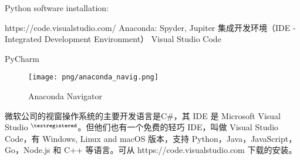 \documentclass[main.tex]{subfiles}
\begin{document}
Python software installation:

https://code.visualstudio.com/
Anaconda: Spyder, Jupiter
集成开发环境（IDE - Integrated Development Environment）
Visual Studio Code

PyCharm

\begin{figure}[h]
	\centering
	\texttt{[image: png/anaconda\_navig.png]}
	\caption{Anaconda Navigator}
	\label{fig:III.1.3}
\end{figure}


微软公司的视窗操作系统的主要开发语言是C\#，其 IDE 是 Microsoft Visual Studio ${}^{\textregistered}$。但他们也有一个免费的轻巧 IDE，叫做 Visual Studio Code，有 Windows, Linux and macOS 版本，支持 Python，Java，JavaScript，Go，Node.js 和 C++ 等语言。可从
https://code.visualstudio.com
下载的安装。
\end{document}

